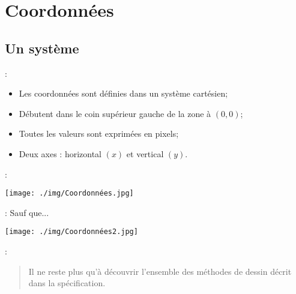 \documentclass[10pt]{beamer}
\begin{document}
\section{Coordonnées}
\tocss
\subsection{Un système}
\begin{frame}{\secname : \subsecname}
    \begin{itemize}
        \item Les coordonnées sont définies dans un système cartésien;
        \item Débutent dans le coin supérieur gauche de la zone à $(0,0)$;
        \item Toutes les valeurs sont exprimées en pixels;
        \item Deux axes : horizontal $(x)$ et vertical $(y)$.
    \end{itemize}
\end{frame}

\begin{frame}{\secname : \subsecname}
    \begin{center}
        \texttt{[image: ./img/Coordonnées.jpg]}
    \end{center}
\end{frame}

\begin{frame}{\secname : \subsecname}
    Sauf que...
    \begin{center}
        \texttt{[image: ./img/Coordonnées2.jpg]}
    \end{center}
\end{frame}

\begin{frame}{\secname : \subsecname}
    \begin{quote}
        Il ne reste plus qu’à découvrir l’ensemble des méthodes de dessin décrit dans la spécification.
    \end{quote}
\end{frame}
\end{document}
